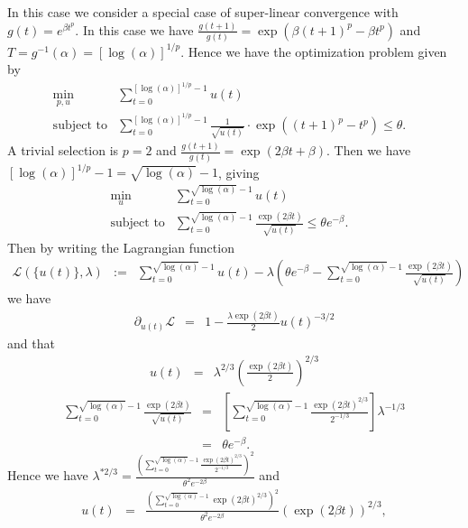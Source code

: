 \documentclass{article}
\newcommand{\assign}{:=}
\newcommand{\cdummy}{\cdot}
\begin{document}
In this case we consider a special case of super-linear convergence with $g
(t) = e^{\beta t^p}$. In this case we have $\frac{g (t + 1)}{g (t)} = \exp
(\beta (t + 1)^p - \beta t^p)$ and $T = g^{- 1} (\alpha) = [\log (\alpha)]^{1
/ p}$. Hence we have the optimization problem given by
\begin{eqnarray*}
  \min_{p, u} & \sum_{t = 0}^{[\log (\alpha)]^{1 / p} - 1} u (t) & \\
  \text{subject to} & \sum_{t = 0}^{[\log (\alpha)]^{1 / p} - 1}
  \frac{1}{\sqrt{u (t)}} \cdummy \exp ((t + 1)^p - t^p) \leq \theta . & 
\end{eqnarray*}
A trivial selection is $p = 2$ and $\frac{g (t + 1)}{g (t)} = \exp (2 \beta t
+ \beta)$. Then we have $[\log (\alpha)]^{1 / p} - 1 = \sqrt{\log (\alpha)} -
1$, giving
\begin{eqnarray*}
  \min_u & \sum_{t = 0}^{\sqrt{\log (\alpha)} - 1} u (t) & \\
  \text{subject to} & \sum_{t = 0}^{\sqrt{\log (\alpha)} - 1} \frac{\exp (2
  \beta t)}{\sqrt{u (t)}} \leq \theta e^{- \beta} . & 
\end{eqnarray*}
Then by writing the Lagrangian function
\begin{eqnarray*}
  \mathcal{L} (\{ u (t) \}, \lambda) & \assign & \sum_{t = 0}^{\sqrt{\log
  (\alpha)} - 1} u (t) - \lambda \left( \theta e^{- \beta} - \sum_{t =
  0}^{\sqrt{\log (\alpha)} - 1} \frac{\exp (2 \beta t)}{\sqrt{u (t)}} \right)
\end{eqnarray*}
we have
\begin{eqnarray*}
  \partial_{u (t)} \mathcal{L} & = & 1 - \frac{\lambda \exp (2 \beta t)}{2} u
  (t)^{- 3 / 2}
\end{eqnarray*}
and that
\begin{eqnarray*}
  u (t) & = & \lambda^{2 / 3} \left( \frac{\exp (2 \beta t)}{2} \right)^{2 /
  3}
\end{eqnarray*}
\begin{eqnarray*}
  \sum_{t = 0}^{\sqrt{\log (\alpha)} - 1} \frac{\exp (2 \beta t)}{\sqrt{u
  (t)}} & = & \left[ \sum_{t = 0}^{\sqrt{\log (\alpha)} - 1} \frac{\exp (2
  \beta t)^{2 / 3}}{2^{- 1 / 3}} \right] \lambda^{- 1 / 3}\\
  & = & \theta e^{- \beta} .
\end{eqnarray*}
Hence we have $\lambda^{\ast 2 / 3} = \frac{\left( \sum_{t = 0}^{\sqrt{\log
(\alpha)} - 1} \frac{\exp (2 \beta t)^{2 / 3}}{2^{- 1 / 3}}
\right)^2}{\theta^2 e^{- 2 \beta}}$ and
\begin{eqnarray*}
  u (t) & = & \frac{\left( \sum_{t = 0}^{\sqrt{\log (\alpha)} - 1} \exp (2
  \beta t)^{2 / 3} \right)^2}{\theta^2 e^{- 2 \beta}} (\exp (2 \beta t))^{2 /
  3},
\end{eqnarray*}
\end{document}
